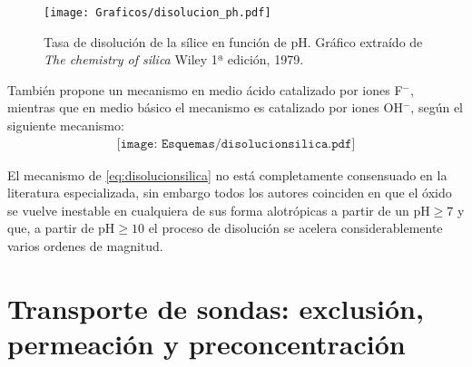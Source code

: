 			\begin{figure}[th!]
			\centering
 	       	\texttt{[image: Graficos/disolucion\_ph.pdf]}
	       		\caption[Tasa de disolución sílice en función del pH]{Tasa de disolución de la sílice en función de pH. Gráfico extraído de \textit{The chemistry of silica} Wiley 1ª edición, 1979.\cite{iler1979}}
	         	\label{fig:disolucion_ph}
	     		\end{figure}
	
	También propone un mecanismo en medio ácido catalizado por iones F$^-$, mientras que en medio básico el mecanismo es catalizado por iones OH$^-$, según el siguiente mecanismo:
			\begin{equation}
				\begin{aligned}
				\texttt{[image: Esquemas/disolucionsilica.pdf]}
				\label{eq:disolucionsilica}
				\end{aligned}
				\end{equation} 
	
	El mecanismo de \ref{eq:disolucionsilica} no está completamente consensuado en la literatura especializada, sin embargo todos los autores coinciden en que el óxido se vuelve inestable en cualquiera de sus forma alotrópicas a partir de un $\text{pH}\geq7$ y que, a partir de $\text{pH}\geq10$ el proceso de disolución se acelera considerablemente varios ordenes de magnitud.\cite{Kosmulski2002,Kosmulski2014,Schwarz1984,Si-HanWu2013,iler1979}

	
				

\section{Transporte de sondas: exclusión, permeación y preconcentración}

